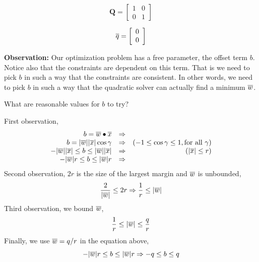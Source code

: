 \documentclass[a4paper,blends,pdf,colorBG,slideColor]{prosper}
\begin{document}
\begin{minipage}{1.5in}
\[
{\mathbf Q} = \left [
\begin{array}{cc}
1 & 0  \\
0 & 1
\end{array}
\right ]
\]
\end{minipage}
\begin{minipage}{1.5in}
\[
\overline{q} = \left [
\begin{array}{c}
0\\
0
\end{array}
\right ]
\]
\end{minipage}

\es


{\bf Observation:} Our optimization problem has a free parameter, the offset term $b$. 
Notice also that the constraints are dependent on this term.  That is we need to
pick $b$ in such a way that the constraints are consistent.  In other words, we need to
pick $b$ in such a way that the quadratic solver can actually find a minimum $\overline{w}$.

What are reasonable values for $b$ to try?
\es

First observation,
\begin{equation*}
\begin{array}{rcr}
b = \overline{w}\bullet\overline{x}&\Rightarrow&\\
b = |{\overline{w}}||{\overline{x}}| \cos \gamma&\Rightarrow& (-1 \le \cos \gamma \le 1, \text{for all $\gamma$})\\
-  |{\overline{w}}||{\overline{x}}| \le b \le  |{\overline{w}}||{\overline{x}}|&\Rightarrow& (|{\overline{x}}| \le r)\\
-  |{\overline{w}}|r \le b \le  |{\overline{w}}|r &\Rightarrow&
\end{array}
\end{equation*}
Second observation, $2r$ is the size of the largest margin and $\overline{w}$ is unbounded,
\begin{equation*}
\frac{2}{|{\overline{w}}|} \le 2r\Rightarrow \frac{1}{r} \le |{\overline{w}}|
\end{equation*}
Third observation, we bound $\overline{w}$,
\begin{equation*}
\frac{1}{r} \le |{\overline{w}}| \le \frac{q}{r}
\end{equation*}
Finally, we use $\overline{w}=q/r$ in the equation above,
\begin{equation*}
-  |{\overline{w}}|r \le b \le  |{\overline{w}}|r \Rightarrow  -q \le b \le  q
\end{equation*}
\es
\end{document}
